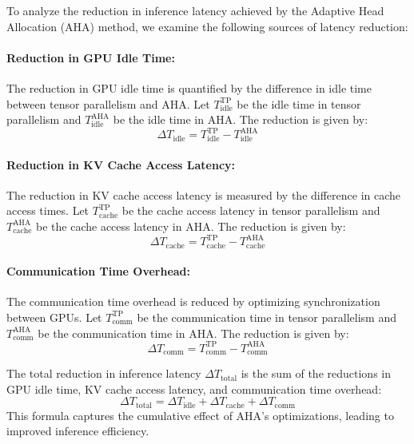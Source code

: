 
To analyze the reduction in inference latency achieved by the Adaptive Head Allocation (AHA) method, we examine the following sources of latency reduction:

\paragraph{Reduction in GPU Idle Time:}
The reduction in GPU idle time is quantified by the difference in idle time between tensor parallelism and AHA. Let \( T_{\text{idle}}^{\text{TP}} \) be the idle time in tensor parallelism and \( T_{\text{idle}}^{\text{AHA}} \) be the idle time in AHA. The reduction is given by:
\[
\Delta T_{\text{idle}} = T_{\text{idle}}^{\text{TP}} - T_{\text{idle}}^{\text{AHA}}
\]

\paragraph{Reduction in KV Cache Access Latency:}
The reduction in KV cache access latency is measured by the difference in cache access times. Let \( T_{\text{cache}}^{\text{TP}} \) be the cache access latency in tensor parallelism and \( T_{\text{cache}}^{\text{AHA}} \) be the cache access latency in AHA. The reduction is given by:
\[
\Delta T_{\text{cache}} = T_{\text{cache}}^{\text{TP}} - T_{\text{cache}}^{\text{AHA}}
\]

\paragraph{Communication Time Overhead:}
The communication time overhead is reduced by optimizing synchronization between GPUs. Let \( T_{\text{comm}}^{\text{TP}} \) be the communication time in tensor parallelism and \( T_{\text{comm}}^{\text{AHA}} \) be the communication time in AHA. The reduction is given by:
\[
\Delta T_{\text{comm}} = T_{\text{comm}}^{\text{TP}} - T_{\text{comm}}^{\text{AHA}}
\]

The total reduction in inference latency \( \Delta T_{\text{total}} \) is the sum of the reductions in GPU idle time, KV cache access latency, and communication time overhead:
\[
\Delta T_{\text{total}} = \Delta T_{\text{idle}} + \Delta T_{\text{cache}} + \Delta T_{\text{comm}}
\]
This formula captures the cumulative effect of AHA's optimizations, leading to improved inference efficiency.


